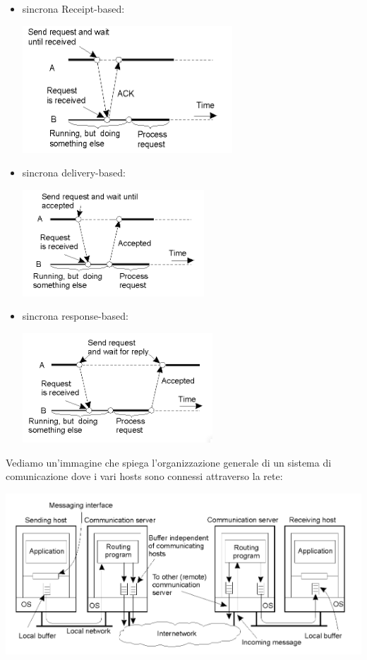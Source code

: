 \message{ !name(sd.tex)}\documentclass[a4paper,12pt, oneside]{book}
\begin{document}
\begin{itemize}
\begin{itemize}
\begin{center}
        \end{center}
		\item sincrona Receipt-based:
		\begin{center}
			\includegraphics[scale=0.8]{img/sin2.png}
        \end{center}
        \item sincrona delivery-based:
        \begin{center}
			\includegraphics[scale=0.8]{img/sin3.png}
        \end{center}
        \item sincrona response-based:
        \begin{center}
			\includegraphics[scale=0.8]{img/sin4.png}
        \end{center}
	\end{itemize}
\end{itemize}
Vediamo un'immagine che spiega l'organizzazione generale di un sistema di comunicazione dove i vari hosts sono connessi attraverso la rete:
\begin{center}
\includegraphics[scale=0.8]{img/host.png}
\end{center}
\end{document}
